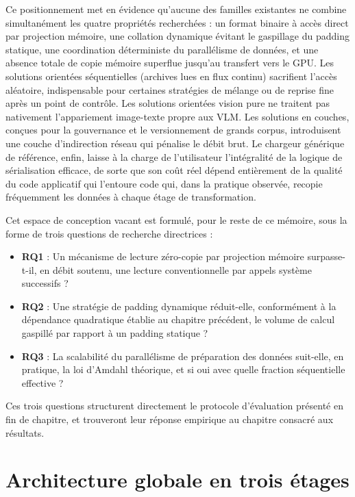 \documentclass[12pt,a4paper]{report}
\begin{document}
Ce positionnement met en évidence qu'aucune des familles existantes ne combine simultanément les quatre propriétés recherchées : un format binaire à accès direct par projection mémoire, une collation dynamique évitant le gaspillage du padding statique, une coordination déterministe du parallélisme de données, et une absence totale de copie mémoire superflue jusqu'au transfert vers le GPU. Les solutions orientées séquentielles (archives lues en flux continu) sacrifient l'accès aléatoire, indispensable pour certaines stratégies de mélange ou de reprise fine après un point de contrôle. Les solutions orientées vision pure ne traitent pas nativement l'appariement image-texte propre aux VLM. Les solutions en couches, conçues pour la gouvernance et le versionnement de grands corpus, introduisent une couche d'indirection réseau qui pénalise le débit brut. Le chargeur générique de référence, enfin, laisse à la charge de l'utilisateur l'intégralité de la logique de sérialisation efficace, de sorte que son coût réel dépend entièrement de la qualité du code applicatif qui l'entoure code qui, dans la pratique observée, recopie fréquemment les données à chaque étage de transformation.

Cet espace de conception vacant est formulé, pour le reste de ce mémoire, sous la forme de trois questions de recherche directrices :

\begin{itemize}
  \item \textbf{RQ1} : Un mécanisme de lecture zéro-copie par projection mémoire surpasse-t-il, en débit soutenu, une lecture conventionnelle par appels système successifs ?
  \item \textbf{RQ2} : Une stratégie de padding dynamique réduit-elle, conformément à la dépendance quadratique établie au chapitre précédent, le volume de calcul gaspillé par rapport à un padding statique ?
  \item \textbf{RQ3} : La scalabilité du parallélisme de préparation des données suit-elle, en pratique, la loi d'Amdahl théorique, et si oui avec quelle fraction séquentielle effective ?
  \end{itemize}

Ces trois questions structurent directement le protocole d'évaluation présenté en fin de chapitre, et trouveront leur réponse empirique au chapitre consacré aux résultats.

\section{Architecture globale en trois étages}
\label{sec:archi_globale}
\end{document}
